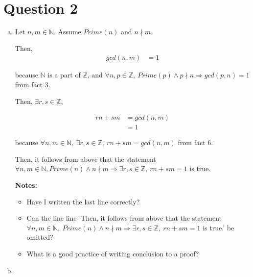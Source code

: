 \documentclass[12pt]{article}
\begin{document}
\begin{enumerate}
\begin{itemize}
    \end{itemize}


\end{enumerate}

\section*{Question 2}
\begin{enumerate}[a.]
    \item

    Let $n,m \in \mathbb{N}$. Assume $Prime(n)$ and $n \nmid m$.

    \bigskip

    Then,
    \setcounter{equation}{0}
    \begin{align}
        gcd(n,m) &= 1
    \end{align}

    because $\mathbb{N}$ is a part of $\mathbb{Z}$, and $\forall n,p \in \mathbb{Z},\:
    Prime(p) \land p \nmid n \Rightarrow gcd(p,n) = 1$ from fact 3.

    \bigskip

    Then, $\exists r, s \in \mathbb{Z}$,

    \begin{align}
        rn + sm &= gcd(n,m)\\
        &= 1
    \end{align}

    because $\forall n,m \in \mathbb{N},\:\exists r,s \in \mathbb{Z},\:rn + sm = gcd(n,m)$
    from fact 6.

    \bigskip

    Then, it follows from above that the statement $\forall n,m \in \mathbb{N},
    Prime(n) \land n \nmid m \Rightarrow \exists r,s \in \mathbb{Z},\:rn + sm = 1$ is true.

    \textbf{Notes:}
    \begin{itemize}
        \item Have I written the last line correctly?
        \item Can the line line 'Then, it follows from above that the statement
        $\forall n,m \in \mathbb{N},\:Prime(n) \land n \nmid m \Rightarrow \exists
        r,s \in \mathbb{Z},\:rn + sm = 1$ is true.' be omitted?

        \item What is a good practice of writing conclusion to a proof?
    \end{itemize}

    \item


\end{enumerate}
\end{document}
